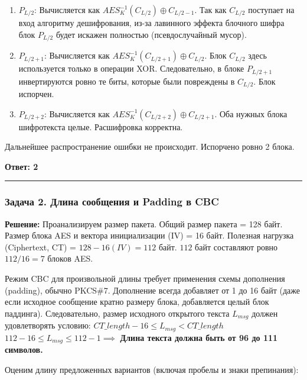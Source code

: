 \begin{enumerate}
\def\labelenumi{\arabic{enumi}.}
\tightlist
\item
  \textbf{\(P_{L/2}\)}: Вычисляется как \(AES^{-1}_K(C_{L/2}) \oplus C_{L/2 - 1}\). Так как \(C_{L/2}\) поступает на вход алгоритму дешифрования, из-за лавинного эффекта блочного шифра блок \(P_{L/2}\) будет искажен полностью (псевдослучайный мусор).
\item
  \textbf{\(P_{L/2 + 1}\)}: Вычисляется как \(AES^{-1}_K(C_{L/2 + 1}) \oplus C_{L/2}\). Блок \(C_{L/2}\) здесь используется только в операции XOR. Следовательно, в блоке \(P_{L/2 + 1}\) инвертируются ровно те биты, которые были повреждены в \(C_{L/2}\). Блок испорчен.
\item
  \textbf{\(P_{L/2 + 2}\)}: Вычисляется как \(AES^{-1}_K(C_{L/2 + 2}) \oplus C_{L/2 + 1}\). Оба нужных блока шифротекста целые. Расшифровка корректна.
\end{enumerate}

Дальнейшее распространение ошибки не происходит. Испорчено ровно 2 блока.

\textbf{Ответ: 2}

\begin{center}\rule{0.5\linewidth}{0.5pt}\end{center}

\subsubsection{Задача 2. Длина сообщения и Padding в CBC}\label{ux437ux430ux434ux430ux447ux430-2.-ux434ux43bux438ux43dux430-ux441ux43eux43eux431ux449ux435ux43dux438ux44f-ux438-padding-ux432-cbc}

\textbf{Решение:} Проанализируем размер пакета. Общий размер пакета = 128 байт. Размер блока AES и вектора инициализации (IV) = 16 байт. Полезная нагрузка (Ciphertext, CT) = \(128 - 16 (IV) = 112\) байт. \(112\) байт составляют ровно \(112 / 16 = 7\) блоков AES.

Режим CBC для произвольной длины требует применения схемы дополнения (padding), обычно PKCS\#7. Дополнение всегда добавляет от 1 до 16 байт (даже если исходное сообщение кратно размеру блока, добавляется целый блок паддинга). Следовательно, размер исходного открытого текста \(L_{msg}\) должен удовлетворять условию: \(CT\_length - 16 \le L_{msg} < CT\_length\) \(112 - 16 \le L_{msg} \le 112 - 1 \implies\) \textbf{Длина текста должна быть от 96 до 111 символов.}

Оценим длину предложенных вариантов (включая пробелы и знаки препинания):

